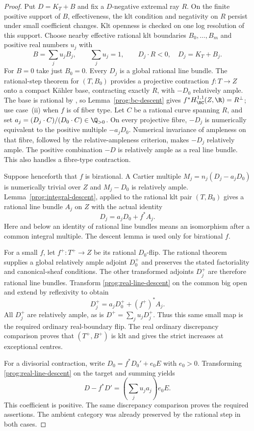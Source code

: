 \begin{proof}
Put $D=K_T+B$ and fix a $D$-negative extremal ray $R$. On the finite
positive support of $B$, effectiveness, the klt condition and negativity
on $R$ persist under small coefficient changes. Klt openness is checked
on one log resolution of this support. Choose nearby effective rational
klt boundaries $B_0,\ldots,B_m$ and positive real numbers $u_j$ with
\[
 B=\sum_j u_jB_j,\qquad \sum_j u_j=1,
 \qquad D_j\cdot R<0,\quad D_j=K_T+B_j.
\]
For $B=0$ take just $B_0=0$. Every $D_j$ is a global rational line
bundle. The rational-step theorem for $(T,B_0)$ provides a projective
contraction $f:T\to Z$ onto a compact K\"ahler base, contracting
exactly $R$, with $-D_0$ relatively ample. The base is rational by
\cite[Lemma~8.8]{DHP}, so Lemma~\ref{prog:bc-descent} gives
$f^*H^{1,1}_{\BC}(Z,\R)=R^\perp$; use case~(ii) when $f$ is of
fiber type.
Let $C$ be a rational curve spanning $R$, and set
$a_j=(D_j\cdot C)/(D_0\cdot C)\in\Q_{>0}$. On every projective
fibre, $-D_j$ is numerically equivalent to the positive multiple
$-a_jD_0$. Numerical invariance of ampleness on that fibre, followed
by the relative-ampleness criterion, makes $-D_j$ relatively ample.
The positive combination $-D$ is relatively ample as a real line
bundle. This also handles a fibre-type contraction.

Suppose henceforth that $f$ is birational. A Cartier multiple
$M_j=n_j(D_j-a_jD_0)$ is numerically trivial over $Z$ and
$M_j-D_0$ is relatively ample. Lemma~\ref{prog:integral-descent},
applied to the rational klt pair $(T,B_0)$ gives a rational line bundle
$A_j$ on $Z$ with the actual identity
\begin{equation}\label{prog:real-line-descent}
 D_j=a_jD_0+f^*A_j.
\end{equation}
Here and below an identity of rational line bundles means an isomorphism
after a common integral multiple. The descent lemma is used only for
birational $f$.

For a small $f$, let $f^+:T^+\to Z$ be its rational $D_0$-flip.
The rational theorem supplies a global relatively ample adjoint
$D_0^+$ and preserves the stated factoriality and canonical-sheaf
conditions. The other transformed adjoints $D_j^+$ are therefore
rational line bundles. Transform \eqref{prog:real-line-descent} on the common
big open and extend by reflexivity to obtain
\[
 D_j^+=a_jD_0^++(f^+)^*A_j.
\]
All $D_j^+$ are relatively ample, as is
$D^+=\sum_j u_jD_j^+$. Thus this same small map is the required
ordinary real-boundary flip. The real ordinary discrepancy comparison
proves that $(T^+,B^+)$ is klt and gives the strict increases at
exceptional centres.

For a divisorial contraction, write
$D_0=f^*D_0'+e_0E$ with $e_0>0$. Transforming
\eqref{prog:real-line-descent} on the target and summing yields
\[
 D-f^*D'=\left(\sum_j u_ja_j\right)e_0E.
\]
This coefficient is positive. The same discrepancy comparison proves
the required assertions. The ambient category was already preserved
by the rational step in both cases.
\end{proof}


